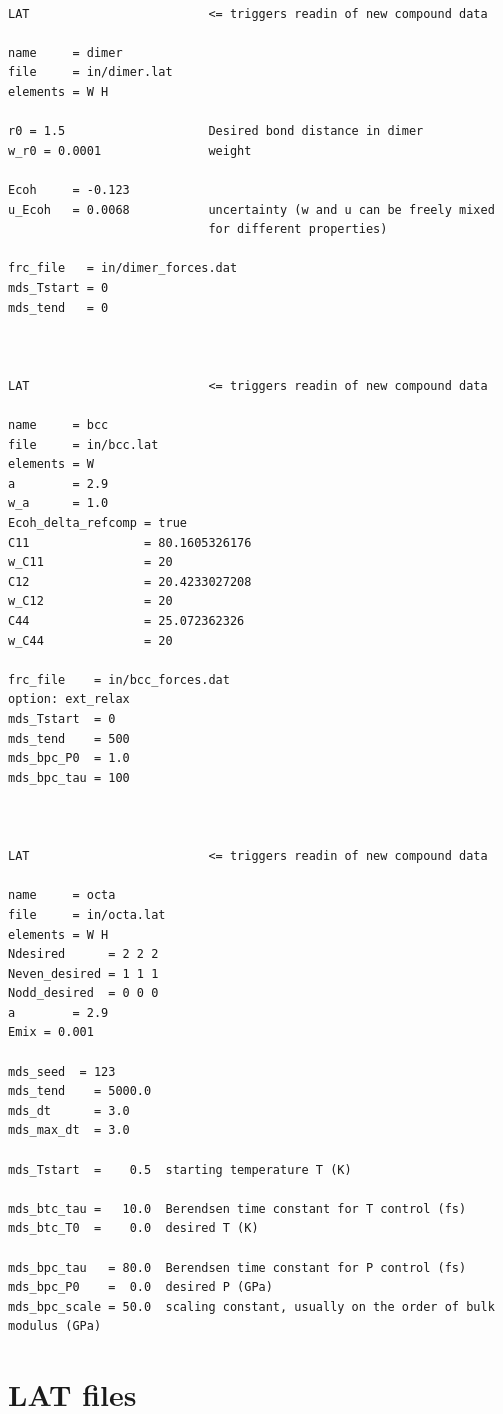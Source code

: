 \documentclass[a4paper,12pt,pdftex,onecolumn]{article}
\begin{document}
\begin{Verbatim}[fontsize=\relsize{-1},frame=single]

LAT                         <= triggers readin of new compound data

name     = dimer
file     = in/dimer.lat
elements = W H

r0 = 1.5                    Desired bond distance in dimer
w_r0 = 0.0001               weight

Ecoh     = -0.123
u_Ecoh   = 0.0068           uncertainty (w and u can be freely mixed
                            for different properties)

frc_file   = in/dimer_forces.dat
mds_Tstart = 0
mds_tend   = 0



LAT                         <= triggers readin of new compound data

name     = bcc
file     = in/bcc.lat
elements = W
a        = 2.9
w_a      = 1.0
Ecoh_delta_refcomp = true
C11                = 80.1605326176
w_C11              = 20
C12                = 20.4233027208
w_C12              = 20
C44                = 25.072362326
w_C44              = 20

frc_file    = in/bcc_forces.dat
option: ext_relax
mds_Tstart  = 0
mds_tend    = 500
mds_bpc_P0  = 1.0
mds_bpc_tau = 100



LAT                         <= triggers readin of new compound data

name     = octa
file     = in/octa.lat
elements = W H
Ndesired      = 2 2 2
Neven_desired = 1 1 1
Nodd_desired  = 0 0 0
a        = 2.9
Emix = 0.001

mds_seed  = 123
mds_tend    = 5000.0
mds_dt      = 3.0
mds_max_dt  = 3.0

mds_Tstart  =    0.5  starting temperature T (K)

mds_btc_tau =   10.0  Berendsen time constant for T control (fs)
mds_btc_T0  =    0.0  desired T (K)

mds_bpc_tau   = 80.0  Berendsen time constant for P control (fs)
mds_bpc_P0    =  0.0  desired P (GPa)
mds_bpc_scale = 50.0  scaling constant, usually on the order of bulk modulus (GPa)

\end{Verbatim}




\section{LAT files}
\end{document}
